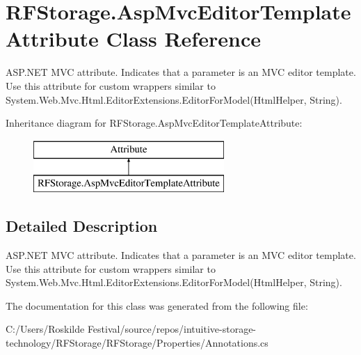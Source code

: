\hypertarget{class_r_f_storage_1_1_asp_mvc_editor_template_attribute}{}\section{R\+F\+Storage.\+Asp\+Mvc\+Editor\+Template\+Attribute Class Reference}
\label{class_r_f_storage_1_1_asp_mvc_editor_template_attribute}


A\+S\+P.\+N\+ET M\+VC attribute. Indicates that a parameter is an M\+VC editor template. Use this attribute for custom wrappers similar to {\ttfamily System.\+Web.\+Mvc.\+Html.\+Editor\+Extensions.\+Editor\+For\+Model(\+Html\+Helper, String)}.  


Inheritance diagram for R\+F\+Storage.\+Asp\+Mvc\+Editor\+Template\+Attribute\+:\begin{figure}[H]
\begin{center}
\leavevmode
\includegraphics[height=2.000000cm]{class_r_f_storage_1_1_asp_mvc_editor_template_attribute}
\end{center}
\end{figure}


\subsection{Detailed Description}
A\+S\+P.\+N\+ET M\+VC attribute. Indicates that a parameter is an M\+VC editor template. Use this attribute for custom wrappers similar to {\ttfamily System.\+Web.\+Mvc.\+Html.\+Editor\+Extensions.\+Editor\+For\+Model(\+Html\+Helper, String)}. 



The documentation for this class was generated from the following file\+:\begin{DoxyCompactItemize}
\item 
C\+:/\+Users/\+Roskilde Festival/source/repos/intuitive-\/storage-\/technology/\+R\+F\+Storage/\+R\+F\+Storage/\+Properties/Annotations.\+cs\end{DoxyCompactItemize}
